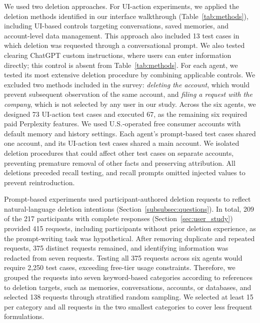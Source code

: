 %
We used two deletion approaches.
%
For UI-action experiments, we applied the deletion methods identified in our interface walkthrough (Table~\ref{tab:methods}), including UI-based controls targeting conversations, saved memories, and account-level data management.
%
This approach also included 13 test cases in which deletion was requested through a conversational prompt.
%
We also tested clearing ChatGPT custom instructions, where users can enter information directly; this control is absent from Table~\ref{tab:methods}.
%
For each agent, we tested its most extensive deletion procedure by combining applicable controls.
%
We excluded two methods included in the survey: \textit{deleting the account}, which would prevent subsequent observation of the same account, and \textit{filing a request with the company}, which is not selected by any user in our study. 
%
Across the six agents, we designed 73 UI-action test cases and executed 67, as the remaining six required paid Perplexity features.
%
We used U.S.-operated free consumer accounts with default memory and history settings.
%
Each agent's prompt-based test cases shared one account, and its UI-action test cases shared a main account.
%
We isolated deletion procedures that could affect other test cases on separate accounts, preventing premature removal of other facts and preserving attribution.
%
All deletions preceded recall testing, and recall prompts omitted injected values to prevent reintroduction.

Prompt-based experiments used participant-authored deletion requests to reflect natural-language deletion intentions (Section~\ref{subsubsec:questions}).
%
In total, 209 of the 217 participants with complete responses (Section~\ref{sec:user_study}) provided 415 requests, including participants without prior deletion experience, as the prompt-writing task was hypothetical.
%
After removing duplicate and repeated requests, 375 distinct requests remained, and identifying information was redacted from seven requests.
%
Testing all 375 requests across six agents would require 2,250 test cases, exceeding free-tier usage constraints.
%
Therefore, we grouped the requests into seven keyword-based categories according to references to deletion targets, such as memories, conversations, accounts, or databases, and selected 138 requests through stratified random sampling.
%
We selected at least 15 per category and all requests in the two smallest categories to cover less frequent formulations.


